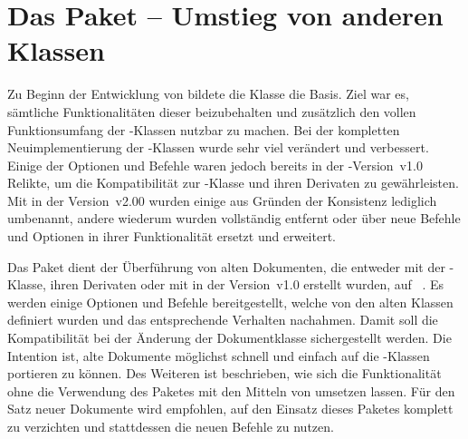 \section{Das Paket  -- Umstieg von anderen Klassen}
\begin{Declaration*}{}
%
%
\noindent{}

\bigskip\noindent
Zu Beginn der Entwicklung von \TUDScript bildete die Klasse 
die Basis. Ziel war es, sämtliche Funktionalitäten dieser beizubehalten und 
zusätzlich den vollen Funktionsumfang der \KOMAScript-Klassen nutzbar zu 
machen. Bei der kompletten Neuimplementierung der \TUDScript-Klassen wurde sehr 
viel verändert und verbessert. Einige der Optionen und Befehle waren jedoch 
bereits in der \TUDScript-Version~v1.0 Relikte, um die Kompatibilität zur 
-Klasse und ihren Derivaten zu gewährleisten. Mit \TUDScript in 
der Version~v2.00 wurden einige aus Gründen der Konsistenz lediglich umbenannt, 
andere wiederum wurden vollständig entfernt oder über neue Befehle und Optionen 
in ihrer Funktionalität ersetzt und erweitert. 

Das Paket  dient der Überführung von alten Dokumenten, die 
entweder mit der -Klasse, ihren Derivaten oder mit \TUDScript in 
der Version~v1.0 erstellt wurden, auf \TUDScript~\vTUDScript. Es werden einige 
Optionen und Befehle bereitgestellt, welche von den alten Klassen definiert 
wurden und das entsprechende Verhalten nachahmen. Damit soll die Kompatibilität 
bei der Änderung der Dokumentklasse sichergestellt werden. Die Intention ist, 
alte Dokumente möglichst schnell und einfach auf die \TUDScript-Klassen 
portieren zu können. Des Weiteren ist beschrieben, wie sich die Funktionalität 
ohne die Verwendung des Paketes mit den Mitteln von \TUDScript umsetzen lassen. 
Für den Satz neuer Dokumente wird empfohlen, auf den Einsatz dieses Paketes 
komplett zu verzichten und stattdessen die neuen Befehle zu nutzen.


\end{Declaration*}
